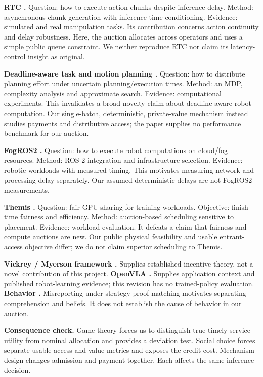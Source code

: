 \textbf{RTC \cite{rtc}.} Question: how to execute action chunks despite inference delay. Method: asynchronous chunk generation with inference-time conditioning. Evidence: simulated and real manipulation tasks. Its contribution concerns action continuity and delay robustness. Here, the auction allocates across operators and uses a simple public queue constraint. We neither reproduce RTC nor claim its latency-control insight as original.

\textbf{Deadline-aware task and motion planning \cite{sung}.} Question: how to distribute planning effort under uncertain planning/execution times. Method: an MDP, complexity analysis and approximate search. Evidence: computational experiments. This invalidates a broad novelty claim about deadline-aware robot computation. Our single-batch, deterministic, private-value mechanism instead studies payments and distributive access; the paper supplies no performance benchmark for our auction.

\textbf{FogROS2 \cite{fogros}.} Question: how to execute robot computations on cloud/fog resources. Method: ROS 2 integration and infrastructure selection. Evidence: robotic workloads with measured timing. This motivates measuring network and processing delay separately. Our assumed deterministic delays are not FogROS2 measurements.

\textbf{Themis \cite{themis}.} Question: fair GPU sharing for training workloads. Objective: finish-time fairness and efficiency. Method: auction-based scheduling sensitive to placement. Evidence: workload evaluation. It defeats a claim that fairness and compute auctions are new. Our public physical feasibility and usable entrant-access objective differ; we do not claim superior scheduling to Themis.

\textbf{Vickrey / Myerson framework \cite{vickrey,roughgarden}.} Supplies established incentive theory, not a novel contribution of this project. \textbf{OpenVLA \cite{openvla}.} Supplies application context and published robot-learning evidence; this revision has no trained-policy evaluation. \textbf{Behavior \cite{hassidim}.} Misreporting under strategy-proof matching motivates separating comprehension and beliefs. It does not establish the cause of behavior in our auction.

\textbf{Consequence check.} Game theory forces us to distinguish true timely-service utility from nominal allocation and provides a deviation test. Social choice forces separate usable-access and value metrics and exposes the credit cost. Mechanism design changes admission and payment together. Each affects the same inference decision.

